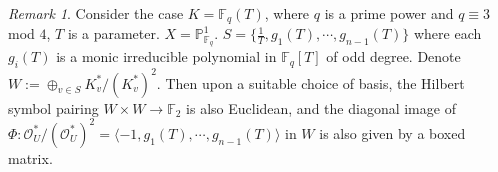 \documentclass[noams]{compositio}
\theoremstyle{definition} %
\theoremstyle{remark} %
\newtheorem{rem}{Remark}
\newcommand{\cO}{\mathcal{O}}
\newcommand{\F}{\mathbb{F}}
\begin{document}
\begin{rem}
Consider the case $K=\F_q(T)$, where $q$ is a prime power and $q \equiv 3$ mod $4$, $T$ is a parameter. $X=\mathbb{P}^1_{\F_q}$. $S=\{\frac{1}{T}, g_1(T),\cdots, g_{n-1}(T)\}$ where each $g_i(T)$ is a monic irreducible polynomial in $\F_q[T]$ of odd degree. Denote $W:=\oplus_{v\in S} K_v^*/(K_v^*)^2$. Then upon a suitable choice of basis, the Hilbert symbol pairing $W\times W\to \F_2$ is also Euclidean, and the diagonal image of $\Phi: \cO^*_U/(\cO^*_U)^2=\langle -1, g_1(T), \cdots, g_{n-1}(T)\rangle$ in $W$ is also given by a boxed matrix.
\end{rem}



\end{document}
